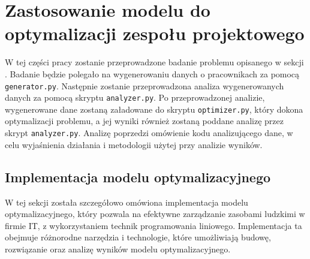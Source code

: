 \section{Zastosowanie modelu do optymalizacji zespołu projektowego}
\par W tej części pracy zostanie przeprowadzone badanie problemu opisanego w sekcji . Badanie będzie polegało na wygenerowaniu danych o pracownikach za pomocą \verb|generator.py|. Następnie zostanie przeprowadzona analiza wygenerowanych danych za pomocą skryptu \verb|analyzer.py|. Po przeprowadzonej analizie, wygenerowane dane zostaną załadowane do skryptu \verb|optimizer.py|, który dokona optymalizacji problemu, a jej wyniki również zostaną poddane analizę przez skrypt \verb|analyzer.py|. Analizę poprzedzi omówienie kodu analizującego dane, w celu wyjaśnienia działania i metodologii użytej przy analizie wyników.
    
    \subsection{Implementacja modelu optymalizacyjnego}\label{subsec:optimizer_implementacja}
        \par W tej sekcji została szczegółowo omówiona implementacja modelu optymalizacyjnego, który pozwala na efektywne zarządzanie zasobami ludzkimi w firmie IT, z wykorzystaniem technik programowania liniowego. Implementacja ta obejmuje różnorodne narzędzia i technologie, które umożliwiają budowę, rozwiązanie oraz analizę wyników modelu optymalizacyjnego.
    
